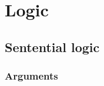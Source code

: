 \documentclass{book}
\begin{document}
\maketitle
\tableofcontents
	\part{Logic}
		\chapter{Sentential logic}
			\section{Arguments}
			
			
\end{document}
